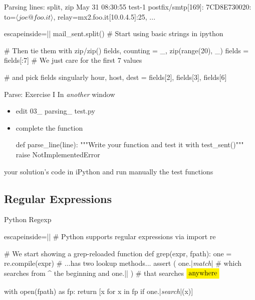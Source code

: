 \begin{pyframe}{Parsing lines: split, zip}
{\footnotesize May 31 08:30:55 test-1 postfix/smtp[169]: 7CD8E730020: to=$\langle joe@foo.it\rangle$, relay=mx2.foo.it[10.0.4.5]:25, ...  }
\begin{pycode*}{escapeinside=||}
mail_sent.split()   # Start using basic strings in ipython

# Then tie them with zip/zip() 
fields, counting  = _, zip(range(20), _)
fields = fields[:7] # We just care for the first 7 values

# and pick fields singularly
hour, host, dest = fields[2], fields[3], fields[6]

\end{pycode*}
\end{pyframe}


\begin{pyframe}{Parse: Exercise I }
In \emph{another} window
\begin{itemize}
\item edit 03\_ parsing\_ test.py
\item complete the  function
\begin{pycode}
def parse_line(line):
    """Write your function and test it
        with test_sent()"""
    raise NotImplementedError
\end{pycode}
\end{itemize}
 your solution's code in iPython and run manually
the test functions
\end{pyframe}



\subsection{Regular Expressions}

\begin{pyframe}{Python Regexp}
\begin{pycode*}{escapeinside=||}
# Python supports regular expressions via
import re

# We start showing a grep-reloaded function
def grep(expr, fpath):
    one = re.compile(expr) # ...has two lookup methods...
    assert ( one.|\emph{match}|     # which searches from ^ the beginning
         and one.|| ) # that searches $\pyver{anywhere}$

    with open(fpath) as fp:
        return [x for x in fp if one.|\emph{search}|(x)]

\end{pycode*}
\end{pyframe}

